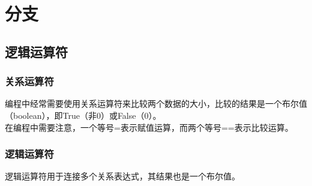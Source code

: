 \chapter{分支}

\section{逻辑运算符}

\subsection{关系运算符}

编程中经常需要使用关系运算符来比较两个数据的大小，比较的结果是一个布尔值（boolean），即True（非0）或False（0）。\\

在编程中需要注意，一个等号=表示赋值运算，而两个等号==表示比较运算。\\

\begin{table}[H]
	\centering
\end{table}

\vspace{0.5cm}

\subsection{逻辑运算符}

逻辑运算符用于连接多个关系表达式，其结果也是一个布尔值。\\

